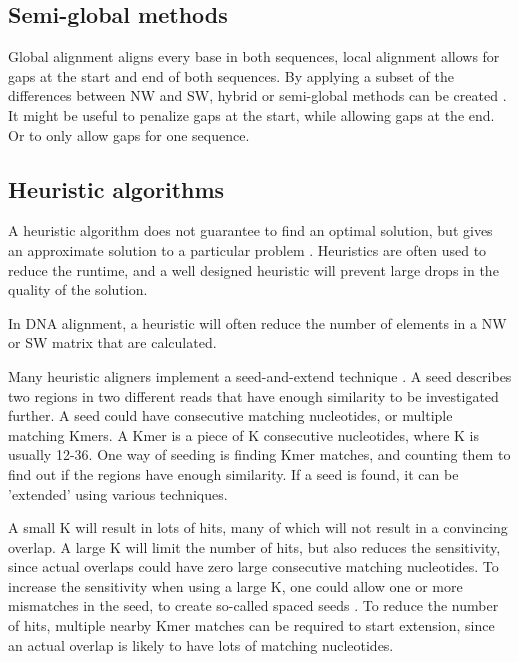 \documentclass[../main/thesis.tex]{subfiles}
\begin{document}
\subsection{Semi-global methods}
Global alignment aligns every base in both sequences, local alignment allows for gaps at the start and end of both sequences.
By applying a subset of the differences between NW and SW, hybrid or semi-global methods can be created \cite{semi_global1}\cite{semi_global2}.
It might be useful to penalize gaps at the start, while allowing gaps at the end.
Or to only allow gaps for one sequence.


\subsection{Heuristic algorithms}

A heuristic algorithm does not guarantee to find an optimal solution, but gives an approximate solution to a particular problem \cite{heuristic}.
Heuristics are often used to reduce the runtime, and a well designed heuristic will prevent large drops in the quality of the solution.

In DNA alignment, a heuristic will often reduce the number of elements in a NW or SW matrix that are calculated.

Many heuristic aligners implement a seed-and-extend technique \cite{seed_extend}.
A seed describes two regions in two different reads that have enough similarity to be investigated further.
A seed could have consecutive matching nucleotides, or multiple matching Kmers.
A Kmer is a piece of K consecutive nucleotides, where K is usually 12-36.
One way of seeding is finding Kmer matches, and counting them to find out if the regions have enough similarity.
If a seed is found, it can be 'extended' using various techniques.

A small K will result in lots of hits, many of which will not result in a convincing overlap.
A large K will limit the number of hits, but also reduces the sensitivity, since actual overlaps could have zero large consecutive matching nucleotides.
To increase the sensitivity when using a large K, one could allow one or more mismatches in the seed, to create so-called spaced seeds \cite{spaced_seeds}.
To reduce the number of hits, multiple nearby Kmer matches can be required to start extension, since an actual overlap is likely to have lots of matching nucleotides.
\end{document}
